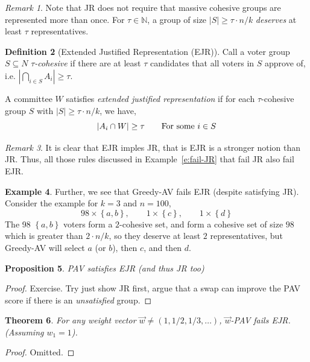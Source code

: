 \documentclass{book}
\theoremstyle{plain}
\newtheorem{theorem}{Theorem}[subsection]
\newtheorem{proposition}[theorem]{Proposition}
\theoremstyle{definition}
\newtheorem{definition}[theorem]{Definition}
\newtheorem{example}[theorem]{Example}
\theoremstyle{remark}
\newtheorem{remark}[theorem]{Remark}
\newcommand{\set}[1]{\left\{#1\right\}}
\begin{document}
\begin{remark}
    Note that JR does not require that 
    massive cohesive groups are represented more than once.
    For $\tau \in \mathbb{N}$, a group of size 
    $|S| \geq \tau \cdot n / k$ \emph{deserves} at least $\tau$ representatives.
\end{remark}

\begin{definition}[Extended Justified Representation (EJR)]
    Call a voter group 
    $S \subseteq N$ \emph{$\tau$-cohesive} if there are at least $\tau$ candidates that all voters in $S$ approve of, i.e.
    $|\bigcap_{i \in S} A_i| \geq \tau$.

    A committee $W$ satisfies 
    \emph{extended justified representation}
    if for each $\tau$-cohesive group $S$ with $|S| \geq \tau \cdot n / k$,
    we have,
    \[
        |A_i \cap W| \geq \tau \text{\qquad For some $i \in S$}
    \]
\end{definition}

\begin{remark}
    It is clear that EJR imples JR, 
    that is EJR is a stronger notion than JR.
    Thus, all those rules discussed in 
    Example~\ref{e:fail-JR} that fail 
    JR also fail EJR.
\end{remark}
\begin{example}
    Further, we see that Greedy-AV 
    fails EJR (despite satisfying JR).
    Consider the example
    for $k = 3$ and $n = 100$,
    \[
        98 \times \set{a, b},
        \qquad 1 \times \set{c},
        \qquad 1 \times \set{d}
    \]
    The 98 $\set{a, b}$ voters form a 
    $2$-cohesive set, and form 
    a cohesive set of size 
    $98$ which is greater than 
    $2 \cdot n / k$,
    so they deserve at least $2$ representatives,
    but Greedy-AV will select $a$ (or $b$), then $c$, and then $d$.
\end{example}

\begin{proposition}
    PAV satisfies EJR (and thus JR too)
\end{proposition}
\begin{proof}
    Exercise. Try just show JR first,
    argue that a swap can improve the 
    PAV score if there is an \emph{unsatisfied} group.
\end{proof}

\begin{theorem}
    For any weight vector 
    $\vec{w} \neq (1, 1/2, 1/3, \dots)$,
    $\vec{w}$-PAV fails EJR.
    (Assuming $w_1 = 1$).
\end{theorem}
\begin{proof}
    Omitted.
\end{proof}
\end{document}

